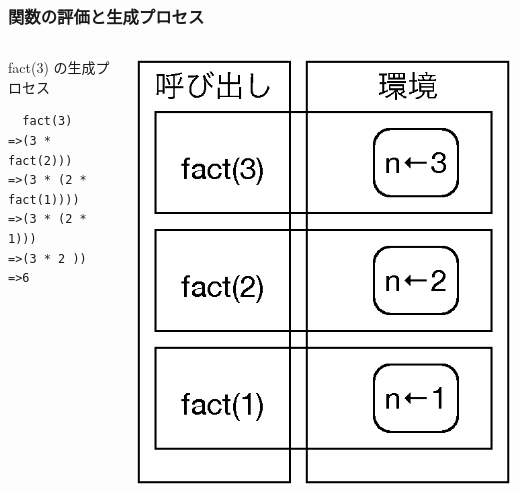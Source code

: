 \begin{frame}[fragile]
\frametitle{関数の評価と生成プロセス}
  \begin{columns}[c]
    \begin{column}{0.6\textwidth}
      \begin{itembox}{fact(3) の生成プロセス}
        \begin{verbatim}
  fact(3)
=>(3 * fact(2)))
=>(3 * (2 * fact(1))))
=>(3 * (2 * 1)))
=>(3 * 2 ))
=>6
        \end{verbatim}
      \end{itembox}
    \end{column}
    \begin{column}{0.35\textwidth}
      \begin{center}
\includegraphics[scale=0.3]{./Figure/elementaryCS-2nd-figStack.eps}
      \end{center}
    \end{column}
  \end{columns}
\end{frame}
